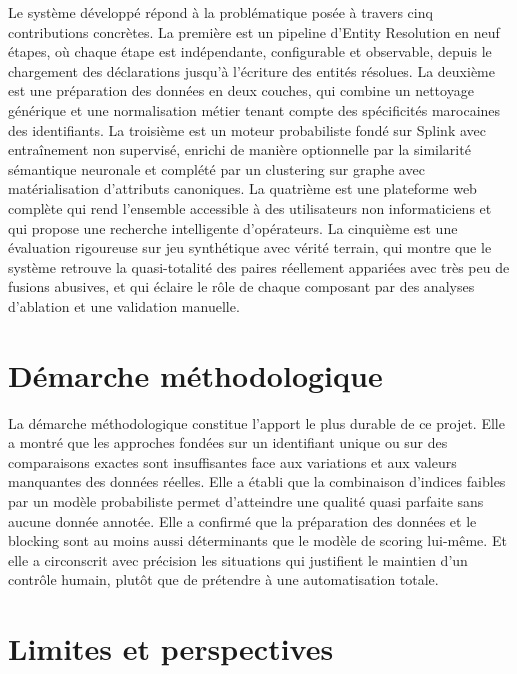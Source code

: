 Le syst\`{e}me d\'{e}velopp\'{e} r\'{e}pond \`{a} la probl\'{e}matique pos\'{e}e \`{a} travers cinq contributions concr\`{e}tes. La premi\`{e}re est un pipeline d'Entity Resolution en neuf \'{e}tapes, o\`{u} chaque \'{e}tape est ind\'{e}pendante, configurable et observable, depuis le chargement des d\'{e}clarations jusqu'\`{a} l'\'{e}criture des entit\'{e}s r\'{e}solues. La deuxi\`{e}me est une pr\'{e}paration des donn\'{e}es en deux couches, qui combine un nettoyage g\'{e}n\'{e}rique et une normalisation m\'{e}tier tenant compte des sp\'{e}cificit\'{e}s marocaines des identifiants. La troisi\`{e}me est un moteur probabiliste fond\'{e} sur Splink avec entra\^{i}nement non supervis\'{e}, enrichi de mani\`{e}re optionnelle par la similarit\'{e} s\'{e}mantique neuronale et compl\'{e}t\'{e} par un clustering sur graphe avec mat\'{e}rialisation d'attributs canoniques. La quatri\`{e}me est une plateforme web compl\`{e}te qui rend l'ensemble accessible \`{a} des utilisateurs non informaticiens et qui propose une recherche intelligente d'op\'{e}rateurs. La cinqui\`{e}me est une \'{e}valuation rigoureuse sur jeu synth\'{e}tique avec v\'{e}rit\'{e} terrain, qui montre que le syst\`{e}me retrouve la quasi-totalit\'{e} des paires r\'{e}ellement appari\'{e}es avec tr\`{e}s peu de fusions abusives, et qui \'{e}claire le r\^{o}le de chaque composant par des analyses d'ablation et une validation manuelle.

\section{D\'{e}marche m\'{e}thodologique}

La d\'{e}marche m\'{e}thodologique constitue l'apport le plus durable de ce projet. Elle a montr\'{e} que les approches fond\'{e}es sur un identifiant unique ou sur des comparaisons exactes sont insuffisantes face aux variations et aux valeurs manquantes des donn\'{e}es r\'{e}elles. Elle a \'{e}tabli que la combinaison d'indices faibles par un mod\`{e}le probabiliste permet d'atteindre une qualit\'{e} quasi parfaite sans aucune donn\'{e}e annot\'{e}e. Elle a confirm\'{e} que la pr\'{e}paration des donn\'{e}es et le blocking sont au moins aussi d\'{e}terminants que le mod\`{e}le de scoring lui-m\^{e}me. Et elle a circonscrit avec pr\'{e}cision les situations qui justifient le maintien d'un contr\^{o}le humain, plut\^{o}t que de pr\'{e}tendre \`{a} une automatisation totale.

\section{Limites et perspectives}

